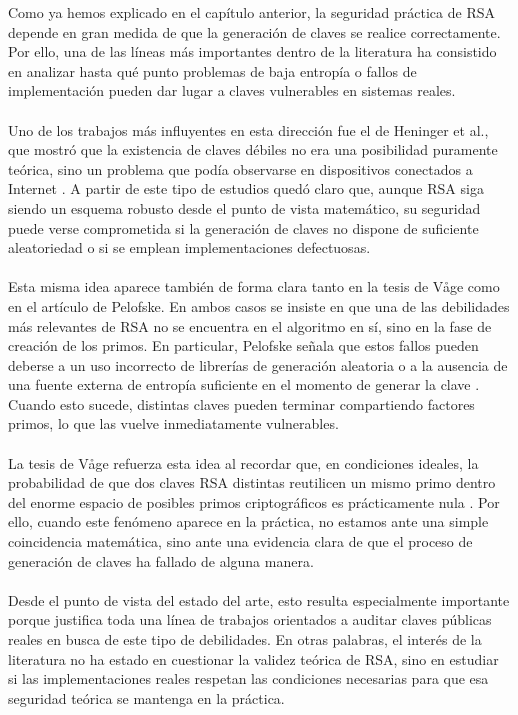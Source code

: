 Como ya hemos explicado en el capítulo anterior, la seguridad práctica de RSA depende en gran medida de que la generación de claves se realice correctamente. Por ello, una de las líneas más importantes dentro de la literatura ha consistido en analizar hasta qué punto problemas de baja entropía o fallos de implementación pueden dar lugar a claves vulnerables en sistemas reales.
\\
\\
Uno de los trabajos más influyentes en esta dirección fue el de Heninger et al., que mostró que la existencia de claves débiles no era una posibilidad puramente teórica, sino un problema que podía observarse en dispositivos conectados a Internet \cite{heninger2012mining}. A partir de este tipo de estudios quedó claro que, aunque RSA siga siendo un esquema robusto desde el punto de vista matemático, su seguridad puede verse comprometida si la generación de claves no dispone de suficiente aleatoriedad o si se emplean implementaciones defectuosas.
\\
\\
Esta misma idea aparece también de forma clara tanto en la tesis de Våge como en el artículo de Pelofske. En ambos casos se insiste en que una de las debilidades más relevantes de RSA no se encuentra en el algoritmo en sí, sino en la fase de creación de los primos. En particular, Pelofske señala que estos fallos pueden deberse a un uso incorrecto de librerías de generación aleatoria o a la ausencia de una fuente externa de entropía suficiente en el momento de generar la clave \cite{pelofske2024efficient}. Cuando esto sucede, distintas claves pueden terminar compartiendo factores primos, lo que las vuelve inmediatamente vulnerables.
\\
\\
La tesis de Våge refuerza esta idea al recordar que, en condiciones ideales, la probabilidad de que dos claves RSA distintas reutilicen un mismo primo dentro del enorme espacio de posibles primos criptográficos es prácticamente nula \cite{vage2022finding}. Por ello, cuando este fenómeno aparece en la práctica, no estamos ante una simple coincidencia matemática, sino ante una evidencia clara de que el proceso de generación de claves ha fallado de alguna manera.
\\
\\
Desde el punto de vista del estado del arte, esto resulta especialmente importante porque justifica toda una línea de trabajos orientados a auditar claves públicas reales en busca de este tipo de debilidades. En otras palabras, el interés de la literatura no ha estado en cuestionar la validez teórica de RSA, sino en estudiar si las implementaciones reales respetan las condiciones necesarias para que esa seguridad teórica se mantenga en la práctica.
